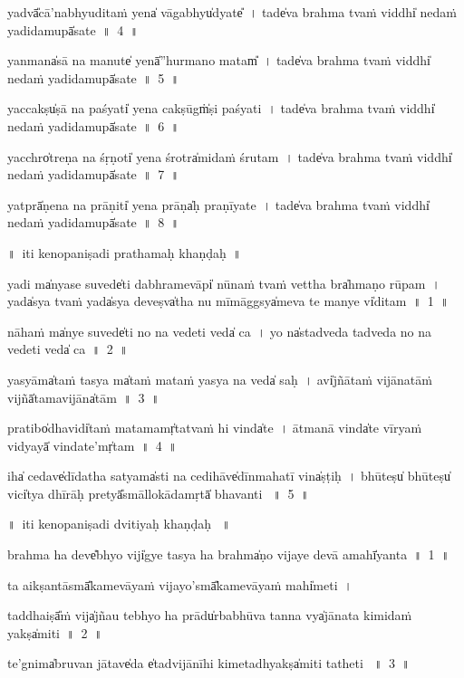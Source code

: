 \documentclass[parskip, DIV=14]{scrartcl}
\begin{document}
{yadvā̎cā'nabhyu॒dita॒ṁ yena̍ vāga॒bhyu̍dyate̎~।
tade̍va brahma tvaṁ viddhi̍ ne॒daṁ ya॒dida॒mupā̍sate~॥~4~॥

yanmana̍sā na ma॒nute̍ yenā̍''hurmano॒ matam̎~।
tade̍va brahma tvaṁ viddhi̍ ne॒daṁ ya॒dida॒mupā̍sate~॥~5~॥

yaccakṣu̍ṣā na pa॒śyati̍ yena॒ cakṣūgṁ̍ṣi paśyati~।
tade̍va brahma tvaṁ viddhi̍ ne॒daṁ ya॒dida॒mupā̍sate~॥~6~॥

yacchro̍treṇa na śṛ॒ṇoti̍ yena॒ śrotra̍midaṁ śrutam~।
tade̍va brahma tvaṁ viddhi̍ ne॒daṁ ya॒dida॒mupā̍sate~॥~7~॥

yatprā̍ṇena na prā॒ṇiti̍ yena॒ prāṇa̍ḥ praṇīyate~।
tade̍va brahma tvaṁ viddhi̍ ne॒daṁ ya॒dida॒mupā̍sate~॥~8~॥
 
\vspace{0.5cm}
 ॥~iti kenopaniṣadi prathamaḥ khaṇḍaḥ~॥
\vspace{0.5cm}

ya॒di ma̍nyase su॒vede̍ti dabhrame॒vāpi̍ %
    nūnaṁ tvaṁ ve॒ttha bra̍hmaṇo rūpam~। 
yada̍sya tvaṁ yada̍sya de॒veṣva̍tha nu mī॒māggsya̍meva te ma॒nye vi̍ditam~॥~1~॥

    
nā॒haṁ ma̍nye su॒vede̍ti no na॒ vedeti॒ veda̍ ca~।
yo na̍stadveda॒ tadveda॒ no na॒ vedeti॒ veda̍ ca~॥~2~॥

ya॒syāma̍taṁ ta॒sya ma̍taṁ mataṁ ya॒sya na॒ veda̍ saḥ~।
avi̍jñātaṁ vijā॒natāṁ vijñā̍tamavi॒jāna̍tām~॥~3~॥

pra॒tibo̍dhavidi̍taṁ mata॒mamṛ̍tatvaṁ hi॒ vinda̍te~।
ā॒tmanā॒ vinda̍te vī॒rya॒ṁ vi॒dyayā̍ vindate॒'mṛ̍tam~॥~4~॥

iha̍ ce॒dave̍dīdatha sa॒tyama̍sti na ce॒dihāve̍dīnma॒hatī॒ vina̍ṣṭiḥ~।
bhū॒teṣu̍ bhū॒teṣu̍ vici̍tya dhī॒rāḥ pretyā̎smāllo॒kāda॒mṛtā̍ bhavanti ~॥~5~॥

\vspace{0.5cm}    
॥~iti kenopaniṣadi dvitiyaḥ khaṇḍaḥ ~॥
\vspace{0.5cm}       
      
bra॒hma ha॒ deve̎bhyo viji̍gye ta॒sya ha॒ brahma̍ṇo vi॒jaye॒ devā amahī̍yanta~॥~1~॥

ta aikṣantāsmā̎kamevā॒yaṁ vijayo'smā̎kamevā॒yaṁ mahi̍meti~।

ta॒ddhaiṣā̎ṁ vija̍jñau te॒bhyo ha॒ prādu̍rbabhūva ta॒nna vya̍jānata ki॒mida॒ṁ yakṣa̍miti~॥~2~॥

te॒'gnima̍bruvan jā॒tave̍da e̍tadvi॒jānī॒hi ki॒meta॒dhyakṣa̍miti tathe॒ti ~॥~3~॥

}
\end{document}
